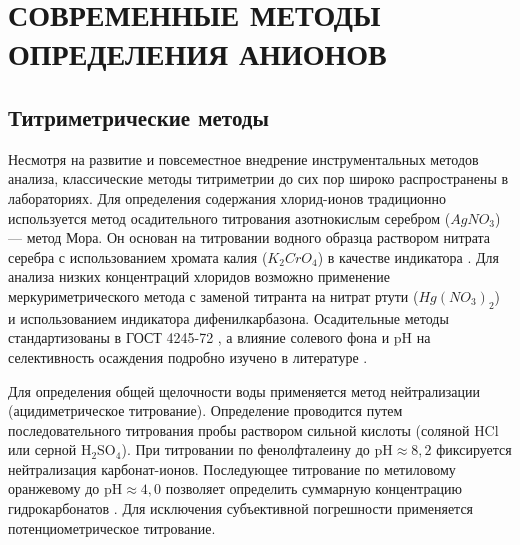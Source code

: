 


\section{СОВРЕМЕННЫЕ МЕТОДЫ ОПРЕДЕЛЕНИЯ АНИОНОВ} %

\subsection{Титриметрические методы}

Несмотря на развитие и повсеместное внедрение инструментальных методов анализа, классические методы титриметрии до сих пор широко распространены в лабораториях. Для определения содержания хлорид-ионов традиционно используется метод осадительного титрования азотнокислым серебром ($AgNO_3$) — метод Мора. Он основан на титровании водного образца раствором нитрата серебра с использованием хромата калия ($K_2CrO_4$) в качестве индикатора \cite{ciapkaMethodologyDeterminingContent2023a}. Для анализа низких концентраций хлоридов возможно применение меркуриметрического метода с заменой титранта на нитрат ртути ($Hg(NO_3)_2$) и использованием индикатора дифенилкарбазона. Осадительные методы стандартизованы в ГОСТ 4245-72 \cite{ciapkaMethodologyDeterminingContent2023a}, а влияние солевого фона и pH на селективность осаждения подробно изучено в литературе \cite{saalidongExaminingDynamicsRelationship2022}.

Для определения общей щелочности воды применяется метод нейтрализации (ацидиметрическое титрование). Определение проводится путем последовательного титрования пробы раствором сильной кислоты (соляной $\text{HCl}$ или серной $\text{H}_2\text{SO}_4$). При титровании по фенолфталеину до $\text{pH} \approx 8{,}2$ фиксируется нейтрализация карбонат-ионов. Последующее титрование по метиловому оранжевому до $\text{pH} \approx 4{,}0$ позволяет определить суммарную концентрацию гидрокарбонатов \cite{saalidongExaminingDynamicsRelationship2022}. Для исключения субъективной погрешности применяется потенциометрическое титрование.

